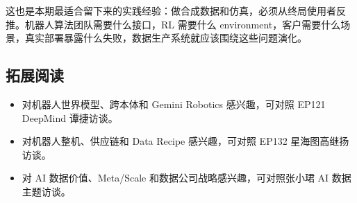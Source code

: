这也是本期最适合留下来的实践经验：做合成数据和仿真，必须从终局使用者反推。机器人算法团队需要什么接口，RL 需要什么 environment，客户需要什么场景，真实部署暴露什么失败，数据生产系统就应该围绕这些问题演化。

\subsection{拓展阅读}

\begin{itemize}
\item 对机器人世界模型、跨本体和 Gemini Robotics 感兴趣，可对照 EP121 DeepMind 谭捷访谈。
\item 对机器人整机、供应链和 Data Recipe 感兴趣，可对照 EP132 星海图高继扬访谈。
\item 对 AI 数据价值、Meta/Scale 和数据公司战略感兴趣，可对照张小珺 AI 数据主题访谈。
\end{itemize}


